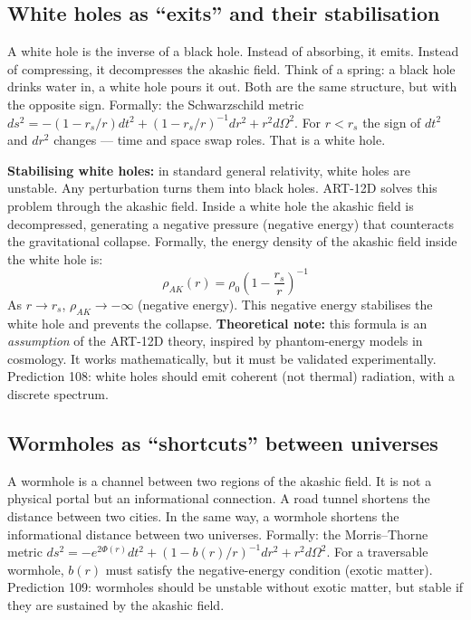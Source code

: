 \documentclass[11pt,a4paper]{article}
\begin{document}
\subsection{White holes as ``exits'' and their stabilisation}
A white hole is the inverse of a black hole. Instead of absorbing, it emits. Instead of compressing, it decompresses the akashic field. Think of a spring: a black hole drinks water in, a white hole pours it out. Both are the same structure, but with the opposite sign. Formally: the Schwarzschild metric $ds^2 = -(1-r_s/r)dt^2 + (1-r_s/r)^{-1}dr^2 + r^2 d\Omega^2$. For $r < r_s$ the sign of $dt^2$ and $dr^2$ changes --- time and space swap roles. That is a white hole.

\textbf{Stabilising white holes:} in standard general relativity, white holes are unstable. Any perturbation turns them into black holes. ART-12D solves this problem through the akashic field. Inside a white hole the akashic field is decompressed, generating a negative pressure (negative energy) that counteracts the gravitational collapse. Formally, the energy density of the akashic field inside the white hole is:
\begin{equation}
\rho_{AK}(r) = \rho_0 \left(1 - \frac{r_s}{r}\right)^{-1}
\end{equation}
As $r \to r_s$, $\rho_{AK} \to -\infty$ (negative energy). This negative energy stabilises the white hole and prevents the collapse. \textbf{Theoretical note:} this formula is an \textit{assumption} of the ART-12D theory, inspired by phantom-energy models in cosmology. It works mathematically, but it must be validated experimentally. Prediction 108: white holes should emit coherent (not thermal) radiation, with a discrete spectrum.

\subsection{Wormholes as ``shortcuts'' between universes}
A wormhole is a channel between two regions of the akashic field. It is not a physical portal but an informational connection. A road tunnel shortens the distance between two cities. In the same way, a wormhole shortens the informational distance between two universes. Formally: the Morris--Thorne metric $ds^2 = -e^{2\Phi(r)}dt^2 + (1-b(r)/r)^{-1}dr^2 + r^2 d\Omega^2$. For a traversable wormhole, $b(r)$ must satisfy the negative-energy condition (exotic matter). Prediction 109: wormholes should be unstable without exotic matter, but stable if they are sustained by the akashic field.
\end{document}

